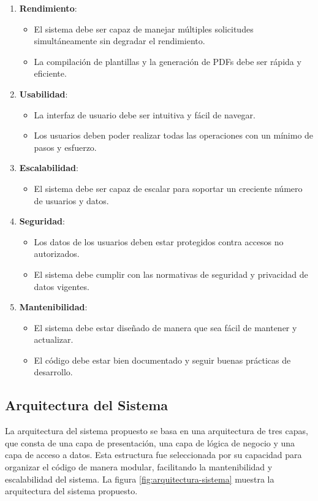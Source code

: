 \begin{enumerate}
    \item \textbf{Rendimiento}:
    \begin{itemize}
        \item El sistema debe ser capaz de manejar múltiples solicitudes simultáneamente sin degradar el rendimiento.
        \item La compilación de plantillas y la generación de PDFs debe ser rápida y eficiente.
    \end{itemize}

    \item \textbf{Usabilidad}:
    \begin{itemize}
        \item La interfaz de usuario debe ser intuitiva y fácil de navegar.
        \item Los usuarios deben poder realizar todas las operaciones con un mínimo de pasos y esfuerzo.
    \end{itemize}

    \item \textbf{Escalabilidad}:
    \begin{itemize}
        \item El sistema debe ser capaz de escalar para soportar un creciente número de usuarios y datos.
    \end{itemize}

    \item \textbf{Seguridad}:
    \begin{itemize}
        \item Los datos de los usuarios deben estar protegidos contra accesos no autorizados.
        \item El sistema debe cumplir con las normativas de seguridad y privacidad de datos vigentes.
    \end{itemize}

    \item \textbf{Mantenibilidad}:
    \begin{itemize}
        \item El sistema debe estar diseñado de manera que sea fácil de mantener y actualizar.
        \item El código debe estar bien documentado y seguir buenas prácticas de desarrollo.
    \end{itemize}
\end{enumerate}


\subsection{Arquitectura del Sistema}
La arquitectura del sistema propuesto se basa en una arquitectura de tres capas, que consta de una capa de presentación, una capa de lógica de negocio y una capa de acceso a datos. Esta estructura fue seleccionada por su capacidad para organizar el código de manera modular, facilitando la mantenibilidad y escalabilidad del sistema. La figura \ref{fig:arquitectura-sistema} muestra la arquitectura del sistema propuesto.

